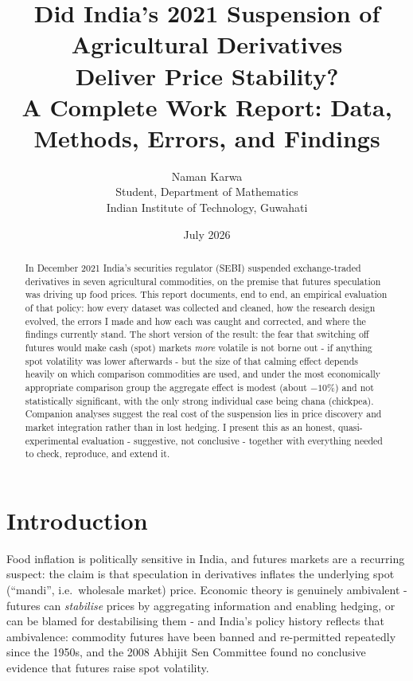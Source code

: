 \documentclass[11pt]{article}
\title{\textbf{Did India's 2021 Suspension of Agricultural Derivatives\\
Deliver Price Stability?}\\[6pt]
\large A Complete Work Report: Data, Methods, Errors, and Findings}
\author{Naman Karwa\\ Student, Department of Mathematics\\ Indian Institute of Technology, Guwahati}
\date{July 2026}
\begin{document}
\maketitle

\begin{abstract}
\noindent In December 2021 India's securities regulator (SEBI) suspended exchange-traded
derivatives in seven agricultural commodities, on the premise that futures speculation was
driving up food prices. This report documents, end to end, an empirical evaluation of that
policy: how every dataset was collected and cleaned, how the research design evolved, the
errors I made and how each was caught and corrected, and where the findings currently
stand. The short version of the result: the fear that switching off futures would make
cash (spot) markets \emph{more} volatile is not borne out - if anything spot volatility
was lower afterwards - but the size of that calming effect depends heavily on which
comparison commodities are used, and under the most economically appropriate comparison
group the aggregate effect is modest (about $-10\%$) and not statistically significant,
with the only strong individual case being chana (chickpea). Companion analyses suggest
the real cost of the suspension lies in price discovery and market integration rather than
in lost hedging. I present this as an honest, quasi-experimental evaluation - suggestive,
not conclusive - together with everything needed to check, reproduce, and extend it.
\end{abstract}

\tableofcontents
\newpage

\section{Introduction}

Food inflation is politically sensitive in India, and futures markets are a recurring
suspect: the claim is that speculation in derivatives inflates the underlying spot
(``mandi'', i.e.\ wholesale market) price. Economic theory is genuinely ambivalent -
futures can \emph{stabilise} prices by aggregating information and enabling hedging, or
can be blamed for destabilising them - and India's policy history reflects that
ambivalence: commodity futures have been banned and re-permitted repeatedly since the
1950s, and the 2008 Abhijit Sen Committee found no conclusive evidence that futures raise
spot volatility.
\end{document}
